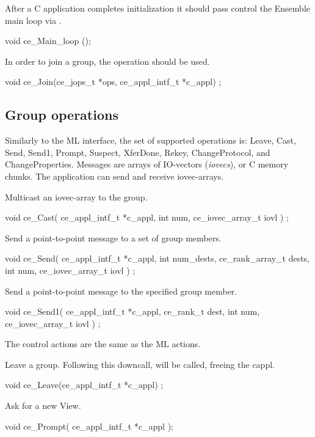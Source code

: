 After a C application completes initialization it should pass control 
the Ensemble main loop via .

\begin{codebox}
void ce_Main_loop ();
\end{codebox}
			 
In order to join a group, the  operation should be used.
\begin{codebox}
void ce_Join(ce_jops_t *ops, ce_appl_intf_t *c_appl) ;
\end{codebox}

\subsection{Group operations}
Similarly to the ML interface, the set of supported operations is:
Leave, Cast, Send, Send1, Prompt, Suspect, XferDone, Rekey,
ChangeProtocol, and ChangeProperties. Messages are arrays of
IO-vectors ({\it iovecs}), or C memory chunks.  The application can
send and receive iovec-arrays.

Multicast an iovec-array to the group. 
\begin{codebox}
void ce_Cast(
    ce_appl_intf_t *c_appl,
    int num,
    ce_iovec_array_t iovl
) ;
\end{codebox}

Send a point-to-point message to a set of group members.
\begin{codebox}
void ce_Send(
    ce_appl_intf_t *c_appl,
    int num_dests,
    ce_rank_array_t dests,
    int num,
    ce_iovec_array_t iovl
) ;
\end{codebox}

Send a point-to-point message to the specified group member.
\begin{codebox}
void ce_Send1(
    ce_appl_intf_t *c_appl,
    ce_rank_t dest,
    int num,
    ce_iovec_array_t iovl
) ;
\end{codebox}

The control actions are the same as the ML actions.

Leave a group. Following this downcall,  will be called, 
freeing the cappl. 
\begin{codebox}
void ce_Leave(ce_appl_intf_t *c_appl) ;
\end{codebox}

Ask for a new View.
\begin{codebox}
void ce_Prompt(
    ce_appl_intf_t *c_appl
);
\end{codebox}

